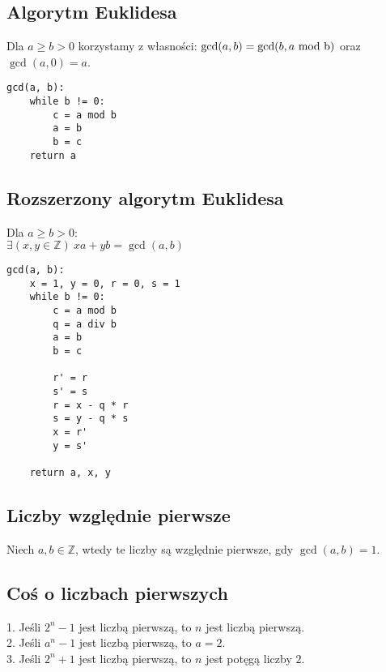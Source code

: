 \subsection*{Algorytm Euklidesa}
Dla $a \geq b > 0$ korzystamy z własności:
$\gcd(a,b) = \gcd(b, a \ \mathrm{mod\ b})$ oraz $\gcd(a, 0) = a$.
\begin{lstlisting}[style=code]
gcd(a, b):
    while b != 0:
        c = a mod b
        a = b
        b = c
    return a
\end{lstlisting}

\subsection*{Rozszerzony algorytm Euklidesa}
Dla $a \geq b > 0$: \\
$\exists (x, y \in \mathbb{Z}) \ xa + yb = \gcd(a, b)$
\begin{lstlisting}[style=code]
gcd(a, b):
    x = 1, y = 0, r = 0, s = 1
    while b != 0:
        c = a mod b
        q = a div b
        a = b
        b = c

        r' = r
        s' = s
        r = x - q * r
        s = y - q * s
        x = r'
        y = s'
    
    return a, x, y
\end{lstlisting}

\subsection*{Liczby względnie pierwsze}
Niech $a, b \in \mathbb{Z}$, wtedy te liczby są względnie pierwsze, gdy
$\gcd(a, b) = 1$.

\subsection*{Coś o liczbach pierwszych}
1. Jeśli $2^n - 1$ jest liczbą pierwszą, to $n$ jest liczbą pierwszą. \\
2. Jeśli $a^n - 1$ jest liczbą pierwszą, to $a = 2$. \\
3. Jeśli $2^n + 1$ jest liczbą pierwszą, to $n$ jest potęgą liczby $2$.